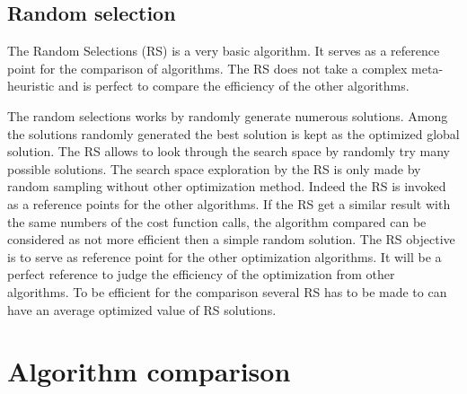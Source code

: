 

\subsection{Random selection }

The Random Selections (RS) is a very basic algorithm. It serves as a reference point for the comparison of  algorithms. The RS does not take a complex meta-heuristic and is perfect to compare the efficiency of the other algorithms.

The random selections works by randomly generate numerous solutions. Among the solutions randomly generated the best solution is kept as the optimized global solution. The RS allows to look through the search space by randomly try many possible solutions. The search space exploration by the RS is only made by random sampling without other optimization method. 
Indeed the RS is invoked as a reference points for the other algorithms. If the RS get a similar result with the same numbers of the cost function calls, the algorithm compared can be considered as not more efficient then a simple random solution. 
The RS objective is to serve as reference point for the other optimization algorithms. It will be a perfect reference to judge the efficiency of the optimization from other algorithms.  To be efficient for the comparison several RS has to be made to can have an average optimized value of RS solutions.  
  
%
%

\section{Algorithm comparison }\label{sec:GAvsPSO} 
%

